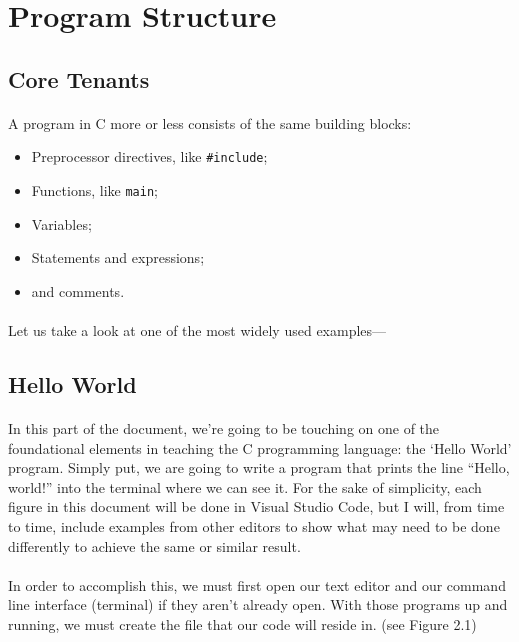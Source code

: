 \section{Program Structure}

\subsection{Core Tenants}
   \paragraph{}
      A program in C more or less consists of the same building blocks\smartcite{TUTPNT:1}:
      \begin{itemize}
         \item Preprocessor directives, like \verb;#include;;
         \item Functions, like \verb;main;;
         \item Variables;
         \item Statements and expressions;
         \item and comments.
      \end{itemize}

   \paragraph{}
      Let us take a look at one of the most widely used examples---

\subsection{Hello World}
   \paragraph{}
      In this part of the document, we're going to be touching on one of the foundational elements in teaching the C programming language: the `Hello World'
      program. Simply put, we are going to write a program that prints the line ``Hello, world!'' into the terminal where we can see it. For the sake of
      simplicity, each figure in this document will be done in Visual Studio Code, but I will, from time to time, include examples from other editors to
      show what may need to be done differently to achieve the same or similar result.

   \paragraph{}
      In order to accomplish this, we must first open our text editor and our command line interface (terminal) if they aren't already open. With those
      programs up and running, we must create the file that our code will reside in. (see Figure 2.1)

